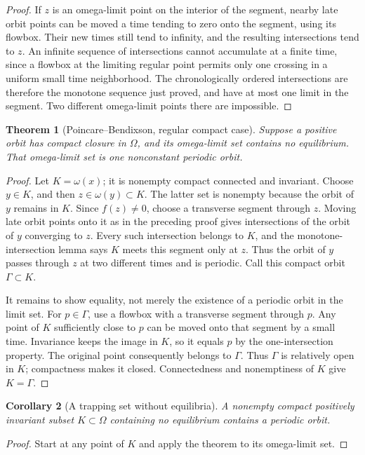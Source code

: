 \documentclass[11pt,oneside]{book}
\newtheorem{theorem}{Theorem}[chapter]
\newtheorem{corollary}[theorem]{Corollary}
\theoremstyle{definition}
\theoremstyle{remark}\newtheorem{remark}[theorem]{Remark}
\begin{document}
\begin{proof}
If \(z\) is an omega-limit point on the interior of the segment,
nearby late orbit points can be moved a time tending to zero onto the
segment, using its flowbox. Their new times still tend to infinity,
and the resulting intersections tend to \(z\).
An infinite sequence of intersections cannot accumulate at a finite
time, since a flowbox at the limiting regular point permits only one
crossing in a uniform small time neighborhood. The chronologically
ordered intersections are therefore the monotone sequence just proved,
and have at most one limit in the segment. Two different omega-limit
points there are impossible.
\end{proof}

\begin{theorem}[Poincare--Bendixson, regular compact case]\label{d13:13:poincare-bendixson}
Suppose a positive orbit has compact closure in \(\Omega\), and its
omega-limit set contains no equilibrium. That omega-limit set is one
nonconstant periodic orbit.
\end{theorem}
\begin{proof}
Let \(K=\omega(x)\); it is nonempty compact connected and invariant.
Choose \(y\in K\), and then \(z\in\omega(y)\subset K\).
The latter set is nonempty because the orbit of \(y\) remains in \(K\).
Since \(f(z)\ne0\), choose a transverse segment through \(z\).
Moving late orbit points onto it as in the preceding proof gives
intersections of the orbit of \(y\) converging to \(z\).
Every such intersection belongs to \(K\), and the monotone-intersection
lemma says \(K\) meets this segment only at \(z\). Thus the orbit of
\(y\) passes through \(z\) at two different times and is periodic.
Call this compact orbit \(\Gamma\subset K\).

It remains to show equality, not merely the existence of a periodic
orbit in the limit set. For \(p\in\Gamma\), use a flowbox with a transverse
segment through \(p\). Any point of \(K\) sufficiently close to \(p\)
can be moved onto that segment by a small time. Invariance keeps the
image in \(K\), so it equals \(p\) by the one-intersection property.
The original point consequently belongs to \(\Gamma\).
Thus \(\Gamma\) is relatively open in \(K\); compactness makes it closed.
Connectedness and nonemptiness of \(K\) give \(K=\Gamma\).
\end{proof}

\begin{corollary}[A trapping set without equilibria]\label{d13:13:trapping}
A nonempty compact positively invariant subset \(K\subset\Omega\)
containing no equilibrium contains a periodic orbit.
\end{corollary}
\begin{proof}
Start at any point of \(K\) and apply the theorem to its omega-limit set.
\end{proof}
\end{document}
